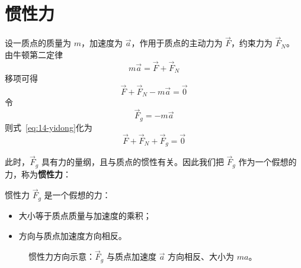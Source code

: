 
\section{惯性力}

设一质点的质量为 $m$，加速度为 $\vec{a}$，作用于质点的主动力为 $\vec{F}$，约束力为 $\vec{F}_N$。
由牛顿第二定律
\begin{equation}\label{eq:14-niudun-erdingshu}
  m\vec{a} = \vec{F} + \vec{F}_N
\end{equation}
移项可得
\begin{equation}\label{eq:14-yidong}
  \vec{F} + \vec{F}_N - m\vec{a} = \vec{0}
\end{equation}
令
\begin{equation}\label{eq:14-guanxingli-jishi}
  \vec{F}_g = -m\vec{a}
\end{equation}
则式~\eqref{eq:14-yidong}化为
\begin{equation}\label{eq:14-zhidian-sanli-pingheng}
  \vec{F} + \vec{F}_N + \vec{F}_g = \vec{0}
\end{equation}

此时，$\vec{F}_g$ 具有力的量纲，且与质点的惯性有关。因此我们把 $\vec{F}_g$ 作为一个假想的力，称为\textbf{惯性力}：
\begin{definition}[惯性力]
惯性力 $\vec{F}_g$ 是一个假想的力：
\begin{itemize}
  \item 大小等于质点质量与加速度的乘积；
  \item 方向与质点加速度方向相反。
\end{itemize}
\end{definition}

\begin{figure}[htbp]
  \centering
  \caption{惯性力方向示意：$\vec{F}_g$ 与质点加速度 $\vec{a}$ 方向相反、大小为 $ma$。}
\end{figure}

